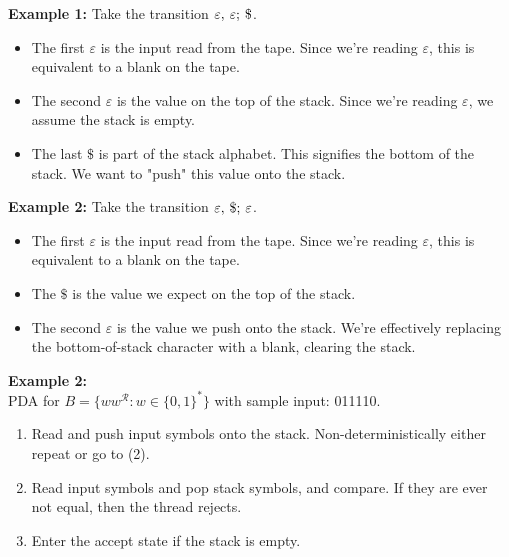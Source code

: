 \documentclass[11pt]{article}
\begin{document}
\begin{note}
\textbf{Example 1:} Take the transition $\varepsilon,\hspace{2px}\varepsilon;\hspace{2px}\$$. 
\begin{itemize}
    \item The first $\varepsilon$ is the input read from the tape. Since we're reading $\varepsilon$, this is equivalent to a blank on the tape.
    \item The second $\varepsilon$ is the value on the top of the stack. Since we're reading $\varepsilon$, we assume the stack is empty.
    \item The last $\$$ is part of the stack alphabet. This signifies the bottom of the stack. We want to "push" this value onto the stack.
\end{itemize}
\textbf{Example 2:} Take the transition $\varepsilon,\hspace{2px}\$;\hspace{2px}\varepsilon$. 
\begin{itemize}
    \item The first $\varepsilon$ is the input read from the tape. Since we're reading $\varepsilon$, this is equivalent to a blank on the tape.
    \item The $\$$ is the value we expect on the top of the stack. 
    \item The second $\varepsilon$ is the value we push onto the stack. We're effectively replacing the bottom-of-stack character with a blank, clearing the stack.
\end{itemize}
\end{note}
\textbf{Example 2:}\\
PDA for $B=\{ww^{\mathcal{R}}:w\in\{0,1\}^{\ast}\}$ with sample input: 011110.
\begin{enumerate}
    \item Read and push input symbols onto the stack. Non-deterministically either repeat or go to (2).
    \item Read input symbols and pop stack symbols, and compare. If they are ever not equal, then the thread rejects.
    \item Enter the accept state if the stack is empty.
\end{enumerate}
\end{document}
